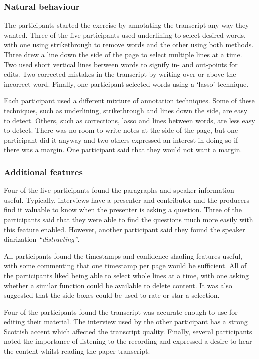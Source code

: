 \subsubsection{Natural behaviour}
The participants started the exercise by annotating the transcript any way they wanted.  Three of the five participants
used underlining to select desired words, with one using strikethrough to remove words and the other using both
methods.  Three drew a line down the side of the page to select multiple lines at a time.  Two used short vertical
lines between words to signify in- and out-points for edits.  Two corrected mistakes in the transcript by writing over
or above the incorrect word. Finally, one participant selected words using a `lasso' technique.

Each participant used a different mixture of annotation techniques. Some of these techniques, such as underlining,
strikethrough and lines down the side, are easy to detect.  Others, such as corrections, lasso and lines between words,
are less easy to detect. There was no room to write notes at the side of the page, but one participant did it anyway
and two others expressed an interest in doing so if there was a margin. One participant said that they would not want a
margin.

\subsubsection{Additional features}
Four of the five participants found the paragraphs and speaker information useful. Typically, interviews have a
presenter and contributor and the producers find it valuable to know when the presenter is asking a question.  Three of
the participants said that they were able to find the questions much more easily with this feature enabled. However,
another participant said they found the speaker diarization \textit{``distracting''}.

All participants found the timestamps and confidence shading features useful, with some commenting that one timestamp
per page would be sufficient.  All of the participants liked being able to select whole lines at a time, with one
asking whether a similar function could be available to delete content. It was also suggested that the side boxes could
be used to rate or star a selection.

Four of the participants found the transcript was accurate enough to use for editing their material.  The interview
used by the other participant has a strong Scottish accent which affected the transcript quality. Finally, several
participants noted the importance of listening to the recording and expressed a desire to hear the content whilst
reading the paper transcript.

